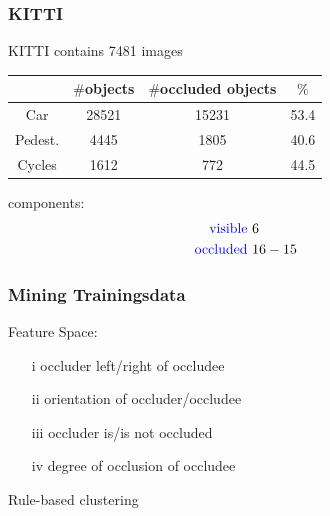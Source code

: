 \documentclass[xcolor=dvipsnames]{beamer}
\begin{document}
\begin{frame}
	\frametitle{KITTI}
	\Large
	\begin{center}
		KITTI contains 7481 images
	\end{center}
	\begin{tabular}{c|c|c|c}
		& $\#$objects & $\#$occluded objects & $\%$ \\
		\hline
		Car & 28521 & 15231 & 53.4 \\
		Pedest. & 4445 & 1805 & 40.6 \\
		Cycles & 1612 & 772 & 44.5 \\
	\end{tabular}
	\vspace{1cm}

	components: 
		\begin{align*}
			\text{\textcolor{blue}{visible} } & 6 \\
			\text{\textcolor{blue}{occluded} } & 16-15 &&\\
		\end{align*}
\end{frame}

\begin{frame}
	\frametitle{Mining Trainingsdata}
	\Large
	Feature Space: \\
	\begin{itemize}
		\item[i]   occluder left/right of occludee
		\item[ii]  orientation of occluder/occludee
		\item[iii] occluder is/is not occluded
		\item[iv] degree of occlusion of occludee
 	\end{itemize}
 	\vspace{1cm}
 	Rule-based clustering
 	\begin{itemize}
	 	\item[] 
 	\end{itemize}
\end{frame}
\end{document}
